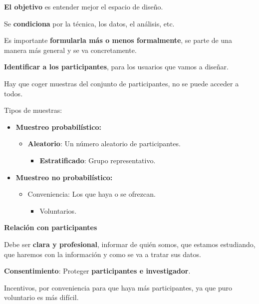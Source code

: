 \documentclass[12pt]{report} %
\begin{document}
\textbf{El objetivo} es entender mejor el espacio de diseño.

Se \textbf{condiciona} por la técnica, los datos, el análisis, etc.

Es importante \textbf{formularla más o menos formalmente}, se parte de
una manera más general y se va concretamente.

\textbf{Identificar a los participantes}, para los usuarios que vamos a
diseñar.

Hay que coger muestras del conjunto de participantes, no se puede
acceder a todos.

Tipos de muestras:

\begin{itemize}

\item
  \textbf{Muestreo probabilístico:}

  \begin{itemize}
  
  \item
    \textbf{Aleatorio}: Un número aleatorio de participantes.

    \begin{itemize}
    
    \item
      \textbf{Estratificado}: Grupo representativo.
    \end{itemize}
  \end{itemize}
\item
  \textbf{Muestreo no probabilístico:}

  \begin{itemize}
  
  \item
    Conveniencia: Los que haya o se ofrezcan.

    \begin{itemize}
    
    \item
      Voluntarios.
    \end{itemize}
  \end{itemize}
\end{itemize}

\textbf{Relación con participantes}

Debe ser \textbf{clara y profesional}, informar de quién somos, que
estamos estudiando, que haremos con la información y como se va a tratar
sus datos.

\textbf{Consentimiento}: Proteger \textbf{participantes e investigador}.

Incentivos, por conveniencia para que haya más participantes, ya que
puro voluntario es más difícil.
\end{document}
